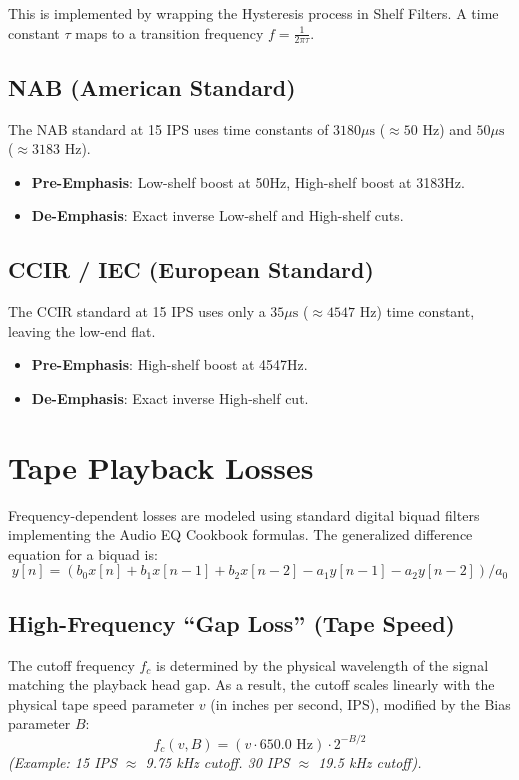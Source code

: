 \documentclass[a4paper, 11pt]{article}
\begin{document}
This is implemented by wrapping the Hysteresis process in Shelf Filters. A time constant $\tau$ maps to a transition frequency $f = \frac{1}{2\pi \tau}$.

\subsection{NAB (American Standard)}
The NAB standard at 15 IPS uses time constants of $3180 \mu\text{s}$ ($\approx 50 \text{ Hz}$) and $50 \mu\text{s}$ ($\approx 3183 \text{ Hz}$).
\begin{itemize}
    \item \textbf{Pre-Emphasis}: Low-shelf boost at 50Hz, High-shelf boost at 3183Hz.
    \item \textbf{De-Emphasis}: Exact inverse Low-shelf and High-shelf cuts.
\end{itemize}

\subsection{CCIR / IEC (European Standard)}
The CCIR standard at 15 IPS uses only a $35 \mu\text{s}$ ($\approx 4547 \text{ Hz}$) time constant, leaving the low-end flat.
\begin{itemize}
    \item \textbf{Pre-Emphasis}: High-shelf boost at 4547Hz.
    \item \textbf{De-Emphasis}: Exact inverse High-shelf cut.
\end{itemize}

\section{Tape Playback Losses}
Frequency-dependent losses are modeled using standard digital biquad filters implementing the Audio EQ Cookbook formulas. The generalized difference equation for a biquad is:
\begin{equation}
    y[n] = (b_0 x[n] + b_1 x[n-1] + b_2 x[n-2] - a_1 y[n-1] - a_2 y[n-2]) / a_0
\end{equation}

\subsection{High-Frequency ``Gap Loss'' (Tape Speed)}
The cutoff frequency $f_c$ is determined by the physical wavelength of the signal matching the playback head gap. As a result, the cutoff scales linearly with the physical tape speed parameter $v$ (in inches per second, IPS), modified by the Bias parameter $B$:
\begin{equation}
    f_c(v, B) = \left(v \cdot 650.0 \text{ Hz}\right) \cdot 2^{-B/2}
\end{equation}
\textit{(Example: 15 IPS $\approx$ 9.75 kHz cutoff. 30 IPS $\approx$ 19.5 kHz cutoff).}
\end{document}
